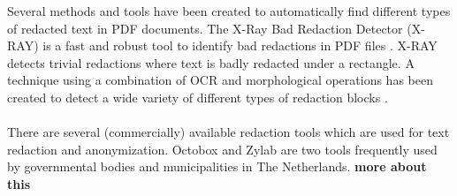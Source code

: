 Several methods and tools have been created to automatically find different types of redacted text in PDF documents. The X-Ray Bad Redaction Detector (X-RAY) is a fast and robust tool to identify bad redactions in PDF files \cite{Xray2021}. X-RAY detects trivial redactions where text is badly redacted under a rectangle. A technique using a combination of OCR and morphological operations has been created to detect a wide variety of different types of redaction blocks \cite{van2023detection}.
\\\\
There are several (commercially) available redaction tools which are used for text redaction and anonymization. Octobox \cite{OCTOBOX} and Zylab \cite{Zylab} are two tools frequently used by governmental bodies and municipalities in The Netherlands. \textbf{more about this}
